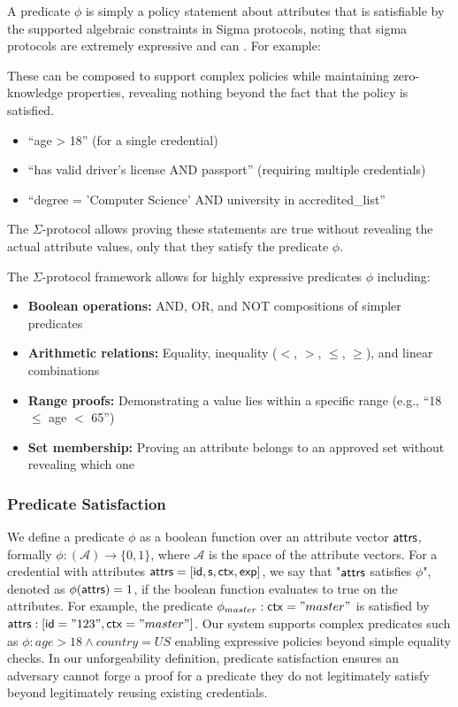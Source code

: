     A predicate $\phi$ is simply a policy statement about attributes that is satisfiable by the supported algebraic constraints in Sigma protocols, noting that sigma protocols are extremely expressive and can  . For example:

    These can be composed to support complex policies while maintaining zero-knowledge properties, revealing nothing beyond the fact that the policy is satisfied.
    \begin{itemize}
    \item ``age > 18'' (for a single credential)
    \item ``has valid driver's license AND passport'' (requiring multiple credentials)
    \item ``degree = 'Computer Science' AND university in accredited\_list''
    \end{itemize}
    
    The $\Sigma$-protocol allows proving these statements are true without revealing the actual attribute values, only that they satisfy the predicate $\phi$.

    The $\Sigma$-protocol framework allows for highly expressive predicates $\phi$ including:
    \begin{itemize}
    \item \textbf{Boolean operations:} AND, OR, and NOT compositions of simpler predicates
    \item \textbf{Arithmetic relations:} Equality, inequality ($<$, $>$, $\leq$, $\geq$), and linear combinations 
    \item \textbf{Range proofs:} Demonstrating a value lies within a specific range (e.g., ``18 $\leq$ age $<$ 65'')
    \item \textbf{Set membership:} Proving an attribute belongs to an approved set without revealing which one
    \end{itemize}

    

\subsubsection*{Predicate Satisfaction}
We define a predicate $\phi$ as a boolean function over an attribute vector $\mathsf{attrs}$, formally  $\phi: (\mathcal{A}) \rightarrow \{0,1\}$, where $\mathcal{A}$ is the space of the attribute vectors. 
For a credential with attributes $\mathsf{attrs} = [\mathsf{id}, \mathsf{s}, \mathsf{ctx}, \mathsf{exp}]$, we say that "$\mathsf{attrs}$ satisfies $\phi$", denoted as $\phi(\mathsf{attrs}) = 1$, if the boolean function evaluates to true on the attributes.
For example, the predicate $\phi_{master}:\mathsf{ctx} = "master"$ is satisfied by $\mathsf{attrs}: [\mathsf{id}="123", \mathsf{ctx}="master"]$. Our system supports complex predicates such as $\phi: age > 18 \wedge country = US$ enabling expressive policies beyond simple equality checks. In our unforgeability definition, predicate satisfaction ensures an adversary cannot forge a proof for a predicate they do not legitimately satisfy beyond legitimately reusing existing credentials.


